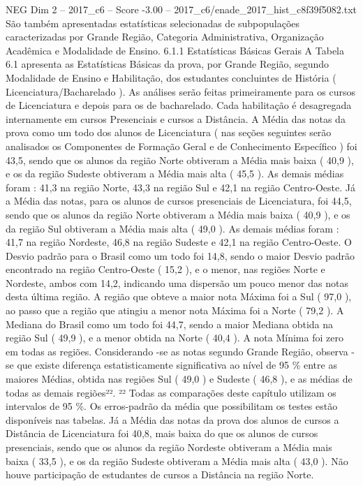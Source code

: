 \begin{textsample}{NEG Dim 2 – 2017\_c6 – Score -3.00 – 2017\_c6/enade\_2017\_hist\_c8f39f5082.txt}
São também apresentadas estatísticas selecionadas de subpopulações caracterizadas por Grande Região, Categoria Administrativa, Organização Acadêmica e Modalidade de Ensino. 6.1.1 Estatísticas Básicas Gerais A Tabela 6.1 apresenta as Estatísticas Básicas da prova, por Grande Região, segundo Modalidade de Ensino e Habilitação, dos estudantes concluintes de História ( Licenciatura/Bacharelado ).
As análises serão feitas primeiramente para os cursos de Licenciatura e depois para os de bacharelado.
Cada habilitação é desagregada internamente em cursos Presenciais e cursos a Distância.
A Média das notas da prova como um todo dos alunos de Licenciatura ( nas seções seguintes serão analisados os Componentes de Formação Geral e de Conhecimento Específico ) foi 43,5, sendo que os alunos da região Norte obtiveram a Média mais baixa ( 40,9 ), e os da região Sudeste obtiveram a Média mais alta ( 45,5 ).
As demais médias foram : 41,3 na região Norte, 43,3 na região Sul e 42,1 na região Centro-Oeste.
Já a Média das notas, para os alunos de cursos presenciais de Licenciatura, foi 44,5, sendo que os alunos da região Norte obtiveram a Média mais baixa ( 40,9 ), e os da região Sul obtiveram a Média mais alta ( 49,0 ).
As demais médias foram : 41,7 na região Nordeste, 46,8 na região Sudeste e 42,1 na região Centro-Oeste.
O Desvio padrão para o Brasil como um todo foi 14,8, sendo o maior Desvio padrão encontrado na região Centro-Oeste ( 15,2 ), e o menor, nas regiões Norte e Nordeste, ambos com 14,2, indicando uma dispersão um pouco menor das notas desta última região.
A região que obteve a maior nota Máxima foi a Sul ( 97,0 ), ao passo que a região que atingiu a menor nota Máxima foi a Norte ( 79,2 ).
A Mediana do Brasil como um todo foi 44,7, sendo a maior Mediana obtida na região Sul ( 49,9 ), e a menor obtida na Norte ( 40,4 ).
A nota Mínima foi zero em todas as regiões.
Considerando -se as notas segundo Grande Região, observa -se que existe diferença estatisticamente significativa ao nível de 95 \% entre as maiores Médias, obtida nas regiões Sul ( 49,0 ) e Sudeste ( 46,8 ), e as médias de todas as demais regiões²². ²² Todas as comparações deste capítulo utilizam os intervalos de 95 \%.
Os erros-padrão da média que possibilitam os testes estão disponíveis nas tabelas.
Já a Média das notas da prova dos alunos de cursos a Distância de Licenciatura foi 40,8, mais baixa do que os alunos de cursos presenciais, sendo que os alunos da região Nordeste obtiveram a Média mais baixa ( 33,5 ), e os da região Sudeste obtiveram a Média mais alta ( 43,0 ).
Não houve participação de estudantes de cursos a Distância na região Norte.

\end{textsample}
